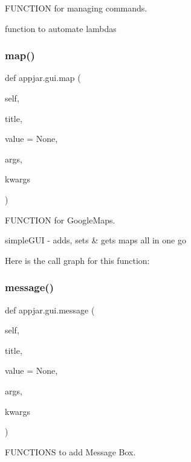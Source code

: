 \begin{DoxyVerb}
F\+U\+N\+C\+T\+I\+ON for managing commands. 

\begin{DoxyVerb}function to automate lambdas \end{DoxyVerb}
 \mbox{\label{classappjar_1_1gui_ab4d56afa73b7e76d44a8b04a4c2ea1f2}} 
\subsubsection{\texorpdfstring{map()}{map()}}
{\footnotesize\ttfamily def appjar.\+gui.\+map (\begin{DoxyParamCaption}\item[{}]{self,  }\item[{}]{title,  }\item[{}]{value = {\ttfamily None},  }\item[{}]{args,  }\item[{}]{kwargs }\end{DoxyParamCaption})}



F\+U\+N\+C\+T\+I\+ON for Google\+Maps. 

\begin{DoxyVerb}simpleGUI - adds, sets & gets maps all in one go \end{DoxyVerb}
 Here is the call graph for this function\+:
\mbox{\label{classappjar_1_1gui_ad6a86c8206b7949e6726fdc8543d1957}} 
\subsubsection{\texorpdfstring{message()}{message()}}
{\footnotesize\ttfamily def appjar.\+gui.\+message (\begin{DoxyParamCaption}\item[{}]{self,  }\item[{}]{title,  }\item[{}]{value = {\ttfamily None},  }\item[{}]{args,  }\item[{}]{kwargs }\end{DoxyParamCaption})}



F\+U\+N\+C\+T\+I\+O\+NS to add Message Box. 


\end{DoxyVerb}
